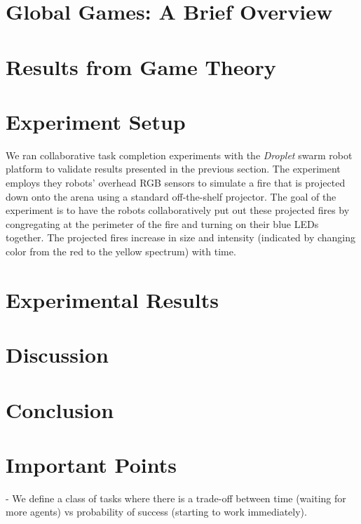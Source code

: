 \documentclass[conference]{IEEEtran}
\begin{document}
\section{Global Games: A Brief Overview}\label{sec:ggoverview}




\section{Results from Game Theory}\label{sec:ggresults}



\section{Experiment Setup}\label{sec:expsetup}
We ran collaborative task completion experiments with the \emph{Droplet} swarm robot platform to validate results presented in the previous section. The experiment employs they robots' overhead RGB sensors to simulate a fire that is projected down onto the arena using a standard off-the-shelf projector. The goal of the experiment is to have the robots collaboratively put out these projected fires by congregating at the perimeter of the fire and turning on their blue LEDs together. The projected fires increase in size and intensity (indicated by changing color from the red to the yellow spectrum) with time.


\section{Experimental Results}\label{sec:expresults}




\section{Discussion}\label{sec:disc}




\section{Conclusion}\label{sec:conc}



\section{Important Points}
- We define a class of tasks where there is a trade-off between time (waiting for more agents) vs probability of success (starting to work immediately).
\end{document}
